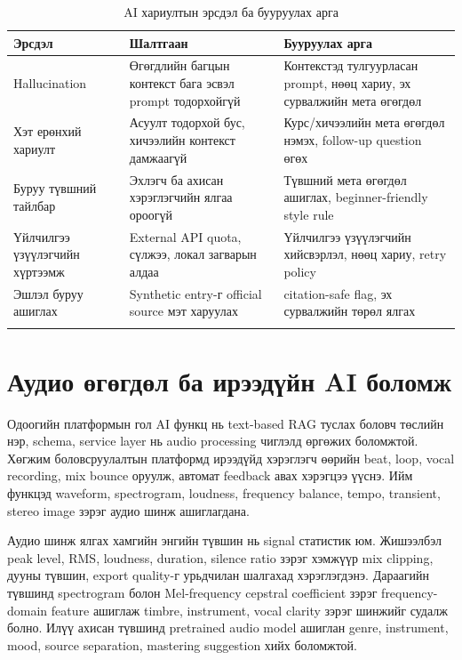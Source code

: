 \begin{longtable}{|p{}|p{}|p{}|}
  \hline
  \textbf{Эрсдэл} & \textbf{Шалтгаан} & \textbf{Бууруулах арга} \\ \hline
  Hallucination & Өгөгдлийн багцын контекст бага эсвэл prompt тодорхойгүй & Контекстэд тулгуурласан prompt, нөөц хариу, эх сурвалжийн мета өгөгдөл \\ \hline
  Хэт ерөнхий хариулт & Асуулт тодорхой бус, хичээлийн контекст дамжаагүй & Курс/хичээлийн мета өгөгдөл нэмэх, follow-up question өгөх \\ \hline
  Буруу түвшний тайлбар & Эхлэгч ба ахисан хэрэглэгчийн ялгаа ороогүй & Түвшний мета өгөгдөл ашиглах, beginner-friendly style rule \\ \hline
  Үйлчилгээ үзүүлэгчийн хүртээмж & External API quota, сүлжээ, локал загварын алдаа & Үйлчилгээ үзүүлэгчийн хийсвэрлэл, нөөц хариу, retry policy \\ \hline
  Эшлэл буруу ашиглах & Synthetic entry-г official source мэт харуулах & citation-safe flag, эх сурвалжийн төрөл ялгах \\ \hline
  \caption{AI хариултын эрсдэл ба бууруулах арга}
  \label{tab:ai-risk-theory}
\end{longtable}

\section{Аудио өгөгдөл ба ирээдүйн AI боломж}
Одоогийн платформын гол AI функц нь text-based RAG туслах боловч төслийн нэр, schema, service layer нь audio processing чиглэлд өргөжих боломжтой. Хөгжим боловсруулалтын платформд ирээдүйд хэрэглэгч өөрийн beat, loop, vocal recording, mix bounce оруулж, автомат feedback авах хэрэгцээ үүснэ. Ийм функцэд waveform, spectrogram, loudness, frequency balance, tempo, transient, stereo image зэрэг аудио шинж ашиглагдана.

Аудио шинж ялгах хамгийн энгийн түвшин нь signal статистик юм. Жишээлбэл peak level, RMS, loudness, duration, silence ratio зэрэг хэмжүүр mix clipping, дууны түвшин, export quality-г урьдчилан шалгахад хэрэглэгдэнэ. Дараагийн түвшинд spectrogram болон Mel-frequency cepstral coefficient зэрэг frequency-domain feature ашиглаж timbre, instrument, vocal clarity зэрэг шинжийг судалж болно. Илүү ахисан түвшинд pretrained audio model ашиглан genre, instrument, mood, source separation, mastering suggestion хийх боломжтой.

